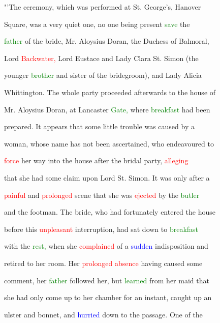  "'The \textcolor{BurntOrange}{ceremony,} which was performed at St. George's, Hanover

 Square, was a very \textcolor{BurntOrange}{quiet} one, no one being \textcolor{BurntOrange}{present} \textcolor{green}{save} the

 \textcolor{green}{father} of the \textcolor{BurntOrange}{bride,} Mr. Aloysius Doran, the Duchess of Balmoral,

 \textcolor{BurntOrange}{Lord} \textcolor{red}{Backwater,} \textcolor{BurntOrange}{Lord} Eustace and Lady Clara St. Simon (the

 \textcolor{BurntOrange}{younger} \textcolor{green}{brother} and sister of the \textcolor{BurntOrange}{bridegroom),} and Lady Alicia

 Whittington. The whole party proceeded afterwards to the house of

 Mr. Aloysius Doran, at Lancaster \textcolor{green}{Gate,} where \textcolor{green}{breakfast} had been

 \textcolor{BurntOrange}{prepared.} It appears that some little trouble was caused by a

 woman, whose name has not been ascertained, who endeavoured to

 \textcolor{red}{force} her way into the house after the \textcolor{BurntOrange}{bridal} party, \textcolor{red}{alleging}

 that she had some claim upon \textcolor{BurntOrange}{Lord} St. Simon. It was only after a

 \textcolor{red}{painful} and \textcolor{red}{prolonged} scene that she was \textcolor{red}{ejected} by the \textcolor{green}{butler}

 and the footman. The \textcolor{BurntOrange}{bride,} who had fortunately entered the house

 before this \textcolor{red}{unpleasant} interruption, had sat down to \textcolor{green}{breakfast}

 with the \textcolor{green}{rest,} when she \textcolor{red}{complained} of a \textcolor{blue}{sudden} indisposition and

 retired to her room. Her \textcolor{red}{prolonged} \textcolor{red}{absence} having caused some

 comment, her \textcolor{green}{father} followed her, but \textcolor{green}{learned} from her maid that

 she had only come up to her chamber for an instant, caught up an

 ulster and bonnet, and \textcolor{blue}{hurried} down to the passage. One of the


